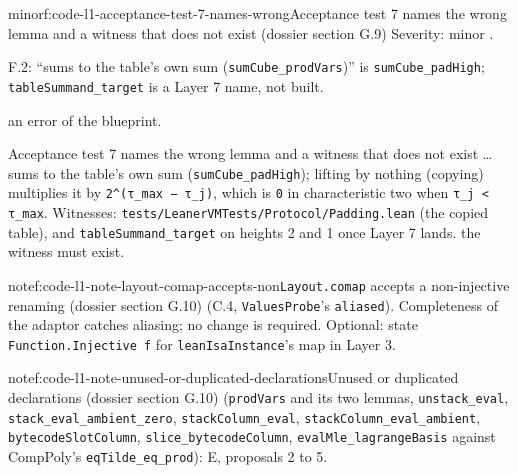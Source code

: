 \begin{finding}{minor}{f:code-l1-acceptance-test-7-names-wrong}{Acceptance test 7 names the wrong lemma and a witness that does not exist (dossier section G.9)}
Severity: minor .

F.2: \enquote{sums to the table's own sum (\texttt{sumCube\_\allowbreak{}prodVars})} is \texttt{sumCube\_\allowbreak{}padHigh}; \texttt{tableSummand\_\allowbreak{}target} is a Layer 7 name, not built.

an error of the blueprint.

\begin{change}{Acceptance test 7 names the wrong lemma and a witness that does not exist}
\asproposed … sums to the table's own sum (\texttt{sumCube\_\allowbreak{}padHigh}); lifting by nothing (copying) multiplies it by \texttt{2\textasciicircum{}(\allowbreak{}τ\_\allowbreak{}max − τ\_\allowbreak{}j)}, which is \texttt{0} in characteristic two when \texttt{τ\_\allowbreak{}j < τ\_\allowbreak{}max}. Witnesses: \texttt{t\allowbreak{}e\allowbreak{}s\allowbreak{}t\allowbreak{}s\allowbreak{}/\allowbreak{}L\allowbreak{}e\allowbreak{}a\allowbreak{}n\allowbreak{}e\allowbreak{}r\allowbreak{}V\allowbreak{}M\allowbreak{}T\allowbreak{}e\allowbreak{}s\allowbreak{}t\allowbreak{}s\allowbreak{}/\allowbreak{}P\allowbreak{}r\allowbreak{}o\allowbreak{}t\allowbreak{}o\allowbreak{}c\allowbreak{}o\allowbreak{}l\allowbreak{}/\allowbreak{}P\allowbreak{}a\allowbreak{}d\allowbreak{}d\allowbreak{}i\allowbreak{}n\allowbreak{}g\allowbreak{}.\allowbreak{}l\allowbreak{}e\allowbreak{}a\allowbreak{}n} (the copied table), and \texttt{tableSummand\_\allowbreak{}target} on heights 2 and 1 once Layer 7 lands.
\reason the witness must exist.
\end{change}

\end{finding}

\begin{finding}{note}{f:code-l1-note-layout-comap-accepts-non}{\texttt{Layout.\allowbreak{}comap} accepts a non-injective renaming (dossier section G.10)}
(C.4, \texttt{ValuesProbe}'s \texttt{aliased}). Completeness of the adaptor catches aliasing; no change is required. Optional: state \texttt{Function.\allowbreak{}Injective f} for \texttt{leanIsaInstance}'s map in Layer 3.

\end{finding}

\begin{finding}{note}{f:code-l1-note-unused-or-duplicated-declarations}{Unused or duplicated declarations (dossier section G.10)}
(\texttt{prodVars} and its two lemmas, \texttt{unstack\_\allowbreak{}eval}, \texttt{stack\_\allowbreak{}eval\_\allowbreak{}ambient\_\allowbreak{}zero}, \texttt{stackColumn\_\allowbreak{}eval}, \texttt{stackColumn\_\allowbreak{}eval\_\allowbreak{}ambient}, \texttt{bytecodeSlotColumn}, \texttt{slice\_\allowbreak{}bytecodeColumn}, \texttt{evalMle\_\allowbreak{}lagrangeBasis} against CompPoly's \texttt{eqTilde\_\allowbreak{}eq\_\allowbreak{}prod}): E, proposals 2 to 5.

\end{finding}


